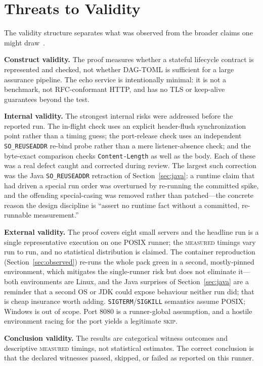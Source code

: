 \documentclass[11pt,letterpaper]{article}
\newcommand{\dagtoml}{DAG-TOML}
\newcommand{\measured}{\textsc{measured}}
\begin{document}
\section{Threats to Validity}

The validity structure separates what was observed from the broader
claims one might draw~\cite{runeson2009case,feldt2010validity}.

\textbf{Construct validity.} The proof measures whether a stateful
lifecycle contract is represented and checked, not whether \dagtoml{} is
sufficient for a large assurance pipeline. The echo service is
intentionally minimal: it is not a benchmark, not RFC-conformant HTTP,
and has no TLS or keep-alive guarantees beyond the test.

\textbf{Internal validity.} The strongest internal risks were addressed
before the reported run. The in-flight check uses an explicit
header-flush synchronization point rather than a timing guess; the
port-release check uses an independent \texttt{SO\_REUSEADDR} re-bind
probe rather than a mere listener-absence check; and the byte-exact
comparison checks \texttt{Content-Length} as well as the body. Each of
these was a real defect caught and corrected during review. The largest
such correction was the Java \texttt{SO\_REUSEADDR} retraction of
Section~\ref{sec:java}: a runtime claim that had driven a special run
order was overturned by re-running the committed spike, and the offending
special-casing was removed rather than patched---the concrete reason the
design discipline is ``assert no runtime fact without a committed,
re-runnable measurement.''

\textbf{External validity.} The proof covers eight small servers and the
headline run is a single representative execution on one POSIX runner; the
\measured{} timings vary run to run, and no statistical distribution is
claimed. The container reproduction (Section~\ref{sec:observed}) re-runs the
whole pack green in a second, mostly-pinned environment, which mitigates the
single-runner risk but does not eliminate it---both environments are Linux,
and the Java surprises of Section~\ref{sec:java} are a reminder that a second
OS or JDK could expose behaviour neither run did; that is cheap insurance worth
adding. \texttt{SIGTERM}/\texttt{SIGKILL} semantics assume POSIX; Windows is
out of scope. Port 8080 is a runner-global assumption, and a hostile
environment racing for the port yields a legitimate \textsc{skip}.

\textbf{Conclusion validity.} The results are categorical witness
outcomes and descriptive \measured{} timings, not statistical estimates.
The correct conclusion is that the declared witnesses passed, skipped, or
failed as reported on this runner.
\end{document}
